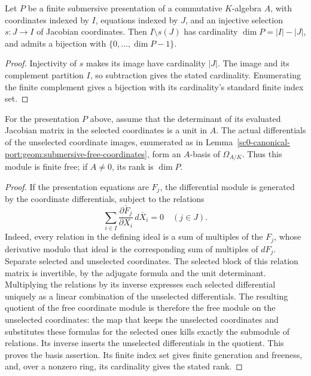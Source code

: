 \begin{lemma}
\label{sc0-canonical-port:geom:submersive-free-coordinates}
\leanok
Let \(P\) be a finite submersive presentation of a commutative
\(K\)-algebra \(A\), with coordinates indexed by \(I\),
equations indexed by \(J\), and an injective selection
\(s:J\to I\) of Jacobian coordinates. Then
\(I\setminus s(J)\) has cardinality
\(\dim P=|I|-|J|\), and admits a bijection with
\(\{0,\ldots,\dim P-1\}\).
\end{lemma}
\begin{proof}
Injectivity of \(s\) makes its image have cardinality \(|J|\).
The image and its complement partition \(I\), so subtraction
gives the stated cardinality. Enumerating the finite complement
gives a bijection with its cardinality's standard finite index set.
\end{proof}

\begin{theorem}
\label{sc0-canonical-port:geom:submersive-differential-basis}
\leanok
For the presentation \(P\) above, assume that the determinant
of its evaluated Jacobian matrix in the selected coordinates is
a unit in \(A\). The actual differentials of the unselected
coordinate images, enumerated as in
Lemma~\ref{sc0-canonical-port:geom:submersive-free-coordinates}, form an
\(A\)-basis of \(\Omega_{A/K}\).
Thus this module is finite free; if \(A\ne0\), its rank is
\(\dim P\).
\end{theorem}
\begin{proof}
If the presentation equations are \(F_j\), the differential
module is generated by the coordinate differentials, subject to
the relations
\[
 \sum_{i\in I}\overline{\frac{\partial F_j}{\partial X_i}}
 \,d\overline X_i=0\quad(j\in J).
\]
Indeed, every relation in the defining ideal is a sum of multiples
of the \(F_j\), whose derivative modulo that ideal is the
corresponding sum of multiples of \(dF_j\).
Separate selected and unselected coordinates. The selected block
of this relation matrix is invertible, by the adjugate formula
and the unit determinant. Multiplying the relations by its inverse
expresses each selected differential uniquely as a linear
combination of the unselected differentials.
The resulting quotient of the free coordinate module is therefore
the free module on the unselected coordinates: the map that keeps
the unselected coordinates and substitutes these formulas for the
selected ones kills exactly the submodule of relations. Its
inverse inserts the unselected differentials in the quotient.
This proves the basis assertion. Its finite index set gives
finite generation and freeness, and, over a nonzero ring, its
cardinality gives the stated rank.
\end{proof}

